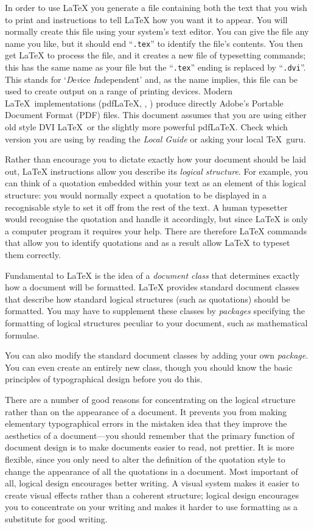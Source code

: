 \documentclass[11pt,a4paper]{article}
\newcommand{\fn}[1]{\hbox{\texttt{#1}}}
\begin{document}
In order to use \LaTeX{} you generate a file containing
both the text that you wish to print and instructions to tell \LaTeX{}
how you want it to appear.  You will normally create
this file using your system's text editor.  You can give the file any name you
like, but it should end ``\fn{.tex}'' to identify the file's contents.
You then get \LaTeX{} to process the file, and it creates a
new file of typesetting commands; this has the same name as your file but
the ``\fn{.tex}'' ending is replaced by ``\fn{.dvi}''.  This stands for
`\textit{D}e\textit{v}ice \textit{I}ndependent' and, as the name implies, this file
can be used to create output on a range of printing devices.
Modern \LaTeX\ implementations (pdf\LaTeX, \XeLaTeX, \LuaLaTeX) produce directly Adobe's Portable Document Format (PDF) files.
This document assumes that you are using either old style DVI \LaTeX\ or the slightly more powerful pdf\LaTeX.
Check which version you are using by reading the \emph{Local Guide} or asking your local \TeX\ guru.

Rather than encourage you to dictate exactly how your document
should be laid out, \LaTeX{} instructions allow you describe its
\emph{logical structure}.  For example, you can think of a quotation
embedded within your text as an element of this logical structure: you would
normally expect a quotation to be displayed in a recognisable style to set it
off from the rest of the text.
A human typesetter would recognise the quotation and handle
it accordingly, but since \LaTeX{} is only a computer program it requires
your help.  There are therefore \LaTeX{} commands that allow you to
identify quotations and as a result allow \LaTeX{} to typeset them correctly.

Fundamental to \LaTeX{} is the idea of a \emph{document class} that
determines exactly how a document will be formatted.  \LaTeX{} provides
standard document classes that describe how standard logical structures
(such as quotations) should be formatted.  You may have to supplement
these classes by \emph{packages} specifying the formatting of logical structures
peculiar to your document, such as mathematical formulae.  

You can also modify the standard document classes 
by adding your own \emph{package}.
You can even create an entirely new class, 
though you should know the basic principles of typographical
design before you do this.

There are a number of good reasons for concentrating on the logical
structure rather than on the appearance of a document.  It prevents
you from making elementary typographical errors in the mistaken
idea that they improve the aesthetics of a document---you should
remember that the primary function of document design is to make
documents easier to read, not prettier.  It is more flexible, since
you only need to alter the definition of the quotation style
to change the appearance of all the quotations in a document.  Most
important of all, logical design encourages better writing.
A visual system makes it easier to create visual effects rather than
a coherent structure; logical design encourages you to concentrate on
your writing and makes it harder to use formatting as a substitute
for good writing.
\end{document}
